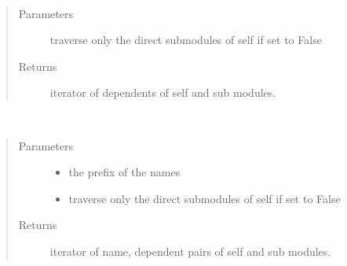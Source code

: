 \documentclass[letterpaper,10pt,english]{sphinxmanual}
\begin{document}
\begin{fulllineitems}
\begin{fulllineitems}
\end{fulllineitems}


\begin{fulllineitems}
\label{\detokenize{metann:metann.DependentModule.dependents}}~\begin{quote}\begin{description}
\item[{Parameters}] \leavevmode
{} \textendash{} traverse only the direct submodules of self if set to False

\item[{Returns}] \leavevmode
iterator of dependents of self and sub modules.

\end{description}\end{quote}

\end{fulllineitems}


\begin{fulllineitems}
\label{\detokenize{metann:metann.DependentModule.named_dependents}}~\begin{quote}\begin{description}
\item[{Parameters}] \leavevmode\begin{itemize}
\item {} 
 \textendash{} the prefix of the names

\item {} 
 \textendash{} traverse only the direct submodules of self if set to False

\end{itemize}

\item[{Returns}] \leavevmode
iterator of name, dependent pairs of self and sub modules.

\end{description}\end{quote}


\end{fulllineitems}
\end{fulllineitems}
\end{document}

